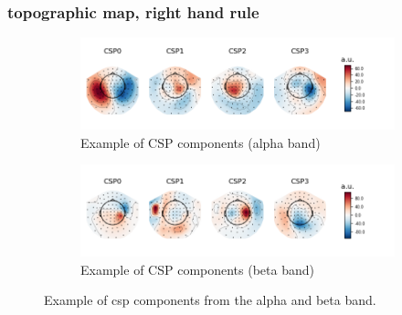 
\subsubsection{topographic map, right hand rule}

\begin{figure}
    \centering
    \begin{subfigure}[b]{0.55\textwidth}
       \includegraphics[width=1\linewidth]{images_report/sensor/csp_individual/sub_155_alpha.png}
       \caption{Example of CSP components (alpha band)}
       \label{fig:csp_component_alpha_band}
    \end{subfigure}
    
    \begin{subfigure}[b]{0.55\textwidth}
       \includegraphics[width=1\linewidth]{images_report/sensor/csp_individual/sub_215_beta.png}
       \caption{Example of CSP components (beta band)}
       \label{fig:csp_component_beta_band}
    \end{subfigure}

    \caption[Example of csp components from the alpha and beta band.]%
    {Example of csp components from the alpha and beta band.}
    \label{example_csp_component}
\end{figure}

